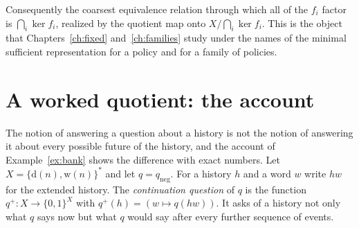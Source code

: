 Consequently the coarsest equivalence relation through which all of the $f_i$ factor is $\bigcap_i\ker f_i$, realized by the quotient map onto $X/\bigcap_i\ker f_i$. This is the object that Chapters~\ref{ch:fixed} and~\ref{ch:families} study under the names of the minimal sufficient representation for a policy and for a family of policies.

\section{A worked quotient: the account}

The notion of answering a question about a history is not the notion of answering it about every possible future of the history, and the account of Example~\ref{ex:bank} shows the difference with exact numbers. Let $X=\{\mathrm{d}(n),\mathrm{w}(n)\}^{*}$ and let $q=q_{\mathrm{neg}}$. For a history $h$ and a word $w$ write $hw$ for the extended history. The \emph{continuation question} of $q$ is the function $q^{+}:X\to\{0,1\}^{X}$ with $q^{+}(h)=(w\mapsto q(hw))$. It asks of a history not only what $q$ says now but what $q$ would say after every further sequence of events.


